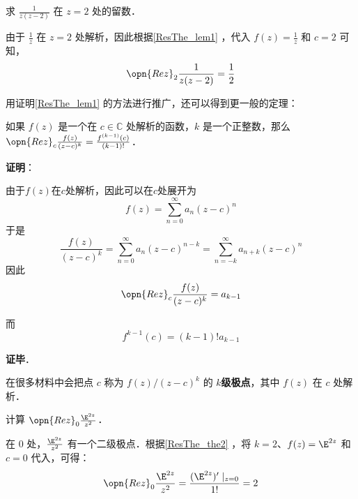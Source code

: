 \begin{example}{}
求 $\frac{1}{z(z-2)}$ 在 $z=2$ 处的留数．

由于 $\frac{1}{z}$ 在 $z=2$ 处解析，因此根据\autoref{ResThe_lem1} ，代入 $f(z)=\frac{1}{z}$ 和 $c=2$ 可知，
\begin{equation}
\opn{Rez}_2\frac{1}{z(z-2)}=\frac{1}{2}
\end{equation}
\end{example}

用证明\autoref{ResThe_lem1} 的方法进行推广，还可以得到更一般的定理：

\begin{theorem}{}\label{ResThe_the2}
如果 $f(z)$ 是一个在 $c\in\mathbb{C}$ 处解析的函数，$k$ 是一个正整数，那么 $\opn{Rez}_c\frac{f(z)}{(z-c)^k}=\frac{f^{(k-1)}(c)}{(k-1)!}$．
\end{theorem}

\textbf{证明}：

由于$f(z)$在$c$处解析，因此可以在$c$处展开为
\begin{equation}
f(z) = \sum_{n=0}^\infty a_n(z-c)^n
\end{equation}
于是
\begin{equation}
\frac{f(z)}{(z-c)^k} = \sum_{n=0}^\infty a_n(z-c)^{n-k} = \sum_{n=-k}^\infty a_{n+k}(z-c)^n
\end{equation}
因此
\begin{equation}
\opn{Rez}_c\frac{f(z)}{(z-c)^k} = a_{k-1}
\end{equation}

而
\begin{equation}
f^{k-1}(c)=(k-1)!a_{k-1}
\end{equation}

\textbf{证毕}．




在很多材料中会把点 $c$ 称为 $f(z)/(z-c)^k$ 的 $k$\textbf{级极点}，其中 $f(z)$ 在 $c$ 处解析．

\begin{example}{}
计算 $\opn{Rez}_0 \frac{\E^{2z}}{z^2}$．

在 $0$ 处，$\frac{\E^{2z}}{z^2}$ 有一个二级极点．根据\autoref{ResThe_the2} ，将 $k=2$、$f(z)=\E^{2z}$ 和 $c=0$ 代入，可得：
\begin{equation}
\opn{Rez}_0\frac{\E^{2z}}{z^2}=\frac{(\E^{2z})'\mid_{z=0}}{1!}=2
\end{equation}


\end{example}












